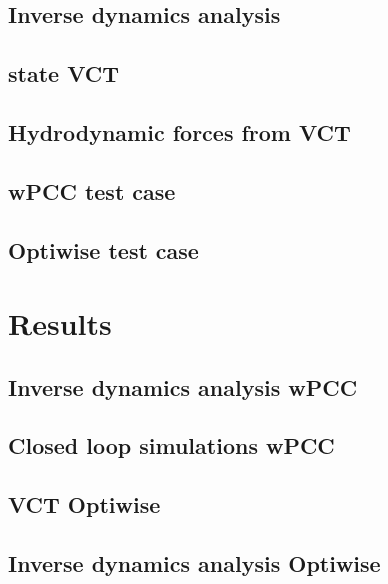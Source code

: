 \documentclass[preprint,9pt,authoryear]{elsarticle}
\begin{document}
\subsection{Inverse dynamics analysis}
\subsection{state VCT}
\subsection{Hydrodynamic forces from VCT}

\subsection{wPCC test case}
\subsection{Optiwise test case}
\FloatBarrier


\section{Results}
\label{sec:results}
%
\FloatBarrier

%

\subsection{Inverse dynamics analysis wPCC}

\FloatBarrier
\subsection{Closed loop simulations wPCC}

\FloatBarrier

\subsection{VCT Optiwise}

\FloatBarrier

\subsection{Inverse dynamics analysis Optiwise}

\FloatBarrier
\end{document}

